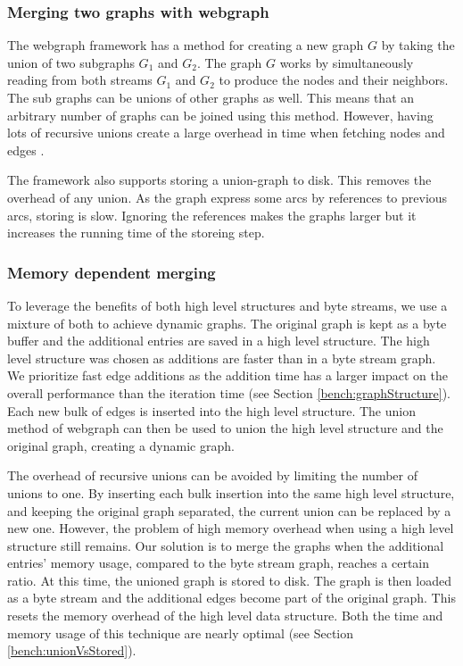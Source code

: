 \subsubsection{Merging two graphs with webgraph}
The webgraph framework has a method for creating a new graph $G$ by taking the union of two subgraphs $G_1$ and $G_2$. The graph $G$ works by simultaneously reading from both streams $G_1$ and $G_2$ to produce the nodes and their neighbors. The sub graphs can be unions of other graphs as well. This means that an arbitrary number of graphs can be joined using this method. However, having lots of recursive unions create a large overhead in time when fetching nodes and edges \cite{webgraph}. 

The framework also supports storing a union-graph to disk. This removes the overhead of any union. As the graph express some arcs by references to previous arcs, storing is slow. Ignoring the references makes the graphs larger but it increases the running time of the storeing step.

\subsubsection{Memory dependent merging}
To leverage the benefits of both high level structures and byte streams, we use a mixture of both to achieve dynamic graphs. The original graph is kept as a byte buffer and the additional entries are saved in a high level structure. The high level structure was chosen as additions are faster than in a byte stream graph. We prioritize fast edge additions as the addition time has a larger impact on the overall performance than the iteration time (see Section \ref{bench:graphStructure}). Each new bulk of edges is inserted into the high level structure. The union method of webgraph can then be used to union the high level structure and the original graph, creating a dynamic graph.

The overhead of recursive unions can be avoided by limiting the number of unions to one. By inserting each bulk insertion into the same high level structure, and keeping the original graph separated, the current union can be replaced by a new one. However, the problem of high memory overhead when using a high level structure still remains. Our solution is to merge the graphs when the additional entries' memory usage, compared to the byte stream graph, reaches a certain ratio. At this time, the unioned graph is stored to disk. The graph is then loaded as a byte stream and the additional edges become part of the original graph. This resets the memory overhead of the high level data structure. Both the time and memory usage of this technique are nearly optimal (see Section \ref{bench:unionVsStored}).

